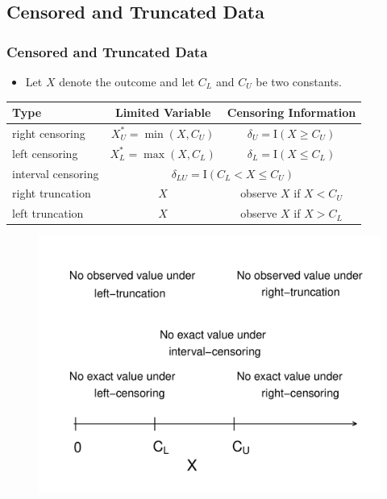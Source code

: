 \documentclass{beamer}
\begin{document}
\subsection{Censored and Truncated Data}

\begin{frame}%
\frametitle{Censored and Truncated Data}
\begin{itemize}
\item Let $X$ denote the outcome and let $C_L$ and $C_U$ be two constants.
\end{itemize}
\vspace{-.05in}
\begin{table}[H]
 \centering
    \begin{tabular}{l|cc}
    \hline
    Type & Limited Variable & Censoring Information \\ \hline
right censoring    & $X_U^{\ast}= \min(X, C_U)$ & $\delta_U= \mathrm{I}(X \geq C_U)$ \\
left censoring     & $X_L^{\ast}= \max(X, C_L)$ & $\delta_L= \mathrm{I}(X \leq C_L)$ \\
interval censoring & \multicolumn{2}{c}{$\delta_{LU}= \mathrm{I}(C_L < X \leq C_U)$ }\\
right truncation   & $X$ & observe $X$ if $ X < C_U$ \\
left truncation    & $X$ & observe $X$ if $ X > C_L$ \\
    \hline
    \end{tabular}
 \end{table}
\vspace{-.1in}
\begin{figure}[htp]
\begin{center}
    \includegraphics[width=.6\textwidth]{Figures/CensoringTrucation.pdf}
\end{center}
\end{figure}
\end{frame}
\end{document}
